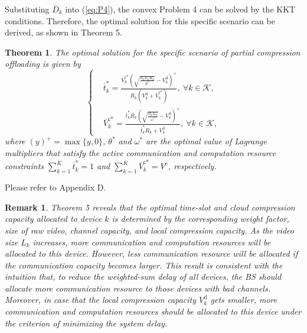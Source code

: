 \documentclass[journal,draftcls,onecolumn,12pt,twoside]{IEEEtran}
\newtheorem{thm}{Theorem}
\newtheorem{rem}{Remark}
\begin{document}
Substituting $\overline{D}_k$ into (\ref{eq:P4}), the convex Problem 4 can be solved by the KKT conditions. Therefore, the optimal solution for this specific scenario can be derived, as shown in Theorem 5.
\begin{thm}
The optimal solution for the specific scenario of partial compression offloading is given by
    \begin{equation}
    	\left\{
        \begin{aligned}
            &\overline{t}_k^* = \frac{\overline{V}_k^{\text{c}*}\left(\sqrt{\frac{\alpha_k L_k R_k}{\theta^*}}-V_k^{\text{d}} \right)^+}{R_k \left( V_k^{\text{d}} + \overline{V}_k^{\text{c}*} \right)},
                ~\forall k \in \mathcal{K},\\
            &\overline{V}_k^{\text{c}*} = \frac{\overline{t}_k^* R_k \left(\sqrt{\frac{\alpha_k L_k}{\omega^*}}-V_k^{\text{d}} \right)^+}{\overline{t}_k^*R_k + V_k^{\text{d}}},
                ~\forall k \in \mathcal{K},
    	\end{aligned}
        \right. \label{32}
    \end{equation}
where $(y)^+= \max\{y, 0\}$, $\theta^*$ and $\omega^*$ are the optimal value of Lagrange multipliers that satisfy the active communication and computation resource constraints $\sum_{k=1}^K \overline{t}_k^* = 1$ and $\sum_{k=1}^K \overline{V}_k^{\text{c}*} = V^{\text{c}}$, respectively.
\end{thm}
\begin{IEEEproof}
	Please refer to Appendix D.
\end{IEEEproof}
\begin{rem}
Theorem 5 reveals that the optimal time-slot and cloud compression capacity allocated to device $k$ is determined by the corresponding weight factor, size of raw video, channel capacity, and local compression capacity. As the video size $L_k$ increases, more communication and computation resources will be allocated to this device. However, less communication resource will be allocated if the communication capacity becomes larger. This result is consistent with the intuition that, to reduce the weighted-sum delay of all devices, the BS should allocate more communication resource to those devices with bad channels. Moreover, in case that the local compression capacity $V_k^{\text{d}}$ gets smaller, more communication and computation resources should be allocated to this device under the criterion of minimizing the system delay.
\end{rem}
\end{document}
